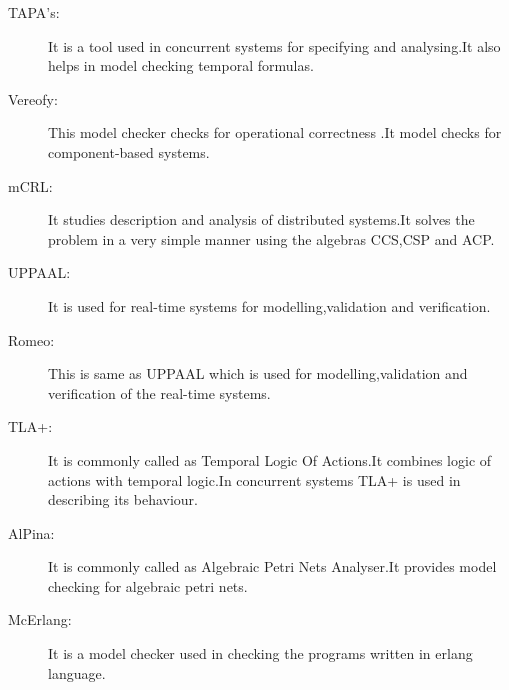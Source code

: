 \documentclass[a4paper,12pt]{extarticle}
\begin{document}
{\begin{description}
\item[TAPA’s:]It is a tool used in concurrent systems for specifying and analysing.It also helps in model checking temporal formulas.
\item[Vereofy:]This model checker checks for operational correctness .It model checks for component-based systems.
\item[mCRL:] It studies description and analysis of distributed systems.It solves the problem in a very simple manner using the algebras CCS,CSP and ACP.
\item[UPPAAL:]It is used for real-time systems for modelling,validation and verification.
\item[Romeo:]This is same as UPPAAL which is used for modelling,validation and verification of the real-time systems.
\item[TLA+:]It is commonly called as Temporal Logic Of Actions.It combines logic of actions with temporal logic.In concurrent systems TLA+ is used in describing its behaviour.
\item[AlPina:]It is commonly called as Algebraic Petri Nets Analyser.It provides model checking for algebraic petri nets.
\item[McErlang:]It is a model checker used in checking the programs written in erlang language.
\end{description}}
\end{document}
